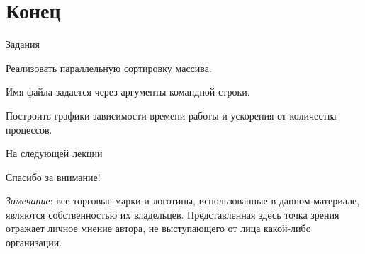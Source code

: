 \section*{Конец}

\begin{frame}{Задания}

Реализовать параллельную сортировку массива.

Имя файла задается через аргументы командной строки.

Построить графики зависимости времени работы и ускорения от количества процессов.

\end{frame}

\begin{frame}{На следующей лекции}
\end{frame}

\begin{frame}

{\huge{Спасибо за внимание!}\par}

\vfill

\tiny{\textit{Замечание}: все торговые марки и логотипы, использованные в данном материале, являются собственностью их владельцев. Представленная здесь точка зрения отражает личное мнение автора, не выступающего от лица какой-либо организации.}

\end{frame}


